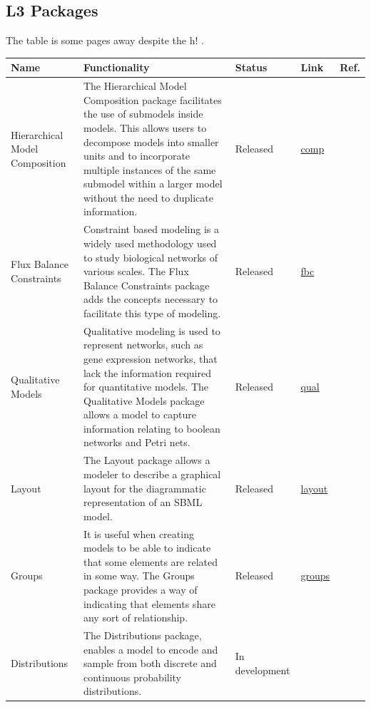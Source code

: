 

\subsection{L3 Packages}

The table is some pages away despite the h! .

\begin{table}[h!]
\centering
\begin{tabular}{|m{8em}|m{25em}|m{5em}|m{5em}|m{1cm}|} 
\hline
Name & Functionality & Status & Link & Ref. \\
 \hline
Hierarchical Model Composition & The Hierarchical Model Composition package facilitates the use of submodels inside models. This allows users to decompose models into smaller units and to incorporate multiple instances of the same submodel within a larger model without the need to duplicate information.  & Released & \href{http://sbml.org/Documents/Specifications/SBML_Level_3/Packages/comp}{comp} & \citep{Smith2015} \\
\hline
Flux Balance Constraints & Constraint based modeling is a widely used methodology used to study biological networks of various scales. The Flux Balance Constraints package adds the concepts necessary to facilitate this type of modeling. & Released & \href{}{fbc} & \citep{Olivier2015} \\
 \hline
Qualitative Models & Qualitative modeling is used to represent networks, such as gene expression networks, that lack the information required for quantitative models. The Qualitative Models package allows a model to capture information relating to boolean networks and Petri nets. & Released & \href{}{qual} & \citep{} \\
 \hline
Layout & 
The Layout package allows a modeler to describe a graphical layout for the diagrammatic representation of an SBML model. & Released & \href{}{layout} & \citep{} \\
 \hline
Groups & It is useful when creating models to be able to indicate that some elements are related in some way. The Groups package provides a way of indicating that elements share any sort of relationship. & Released & \href{}{groups} & \citep{} \\
 \hline
Distributions & The Distributions package, enables a model to encode and sample from both discrete and continuous probability distributions. & In development & \href{}{} & \citep{} \\

\end{tabular}
\end{table}
